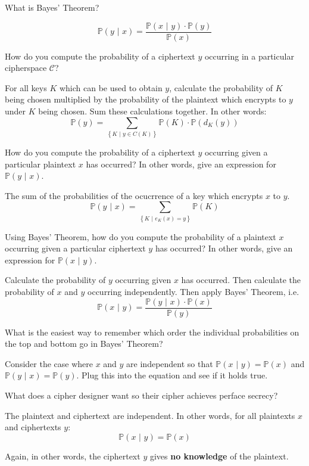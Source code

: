 \documentclass{article}
\newcounter{qcounter}
\newcommand{\showqcounter}{\theqcounter}
\newcommand{\question}{\vspace{5mm}\addtocounter{qcounter}{1}\vspace{5mm}{\bf Q\showqcounter: }}
\newcommand{\answer}{\vspace{5mm}{\bf A\showqcounter: }}
\newcommand{\probgiven}[2]{\mathbb{P}\left( #1 \,\, \vert \,\, #2 \right)}
\newcommand{\prob}[1]{\mathbb{P}\left( #1 \right)}
\begin{document}
\question What is Bayes' Theorem?

\answer 
  $$
    \probgiven{y}{x} = \frac{\probgiven{x}{y} \cdot \prob{y}}{\prob{x}}
  $$


\question How do you compute the probability of a ciphertext $y$ occurring in a particular cipherspace $\mathcal{C}$?

\answer For all keys $K$ which can be used to obtain $y$, calculate the probability of $K$ being chosen multiplied by the probability 
  of the plaintext which encrypts to $y$ under $K$ being chosen. Sum these calculations together. In other words:
  $$
    \prob{y} = \sum_{\left\{ K \,\, \vert \,\, y \in C(K)\right\}} \prob{K} \cdot \prob{d_K(y)}
  $$


\question How do you compute the probability of a ciphertext $y$ occurring given a particular plaintext $x$ has occurred? In other 
  words, give an expression for $\probgiven{y}{x}$.

\answer The sum of the probabilities of the ocucrrence of a key which encrypts $x$ to $y$.
  $$
    \probgiven{y}{x} = \sum_{ \left\{ K \,\, \vert \,\, e_K(x) = y \right\} } \prob{K}
  $$


\question Using Bayes' Theorem, how do you compute the probability of a plaintext $x$ occurring given a particular ciphertext $y$ 
  has occurred? In other words, give an expression for $\probgiven{x}{y}$.

\answer Calculate the probability of $y$ occurring given $x$ has occurred. Then calculate the probability of $x$ and $y$ occurring independently.
  Then apply Bayes' Theorem, i.e.
  $$
    \probgiven{x}{y} = \frac{\probgiven{y}{x} \cdot \prob{x}}{\prob{y}}
  $$


\question What is the easiest way to remember which order the individual probabilities on the top and bottom go in Bayes' Theorem?

\answer Consider the case where $x$ and $y$ are independent so that $\probgiven{x}{y} = \prob{x}$ and $\probgiven{y}{x} = \prob{y}$. Plug 
  this into the equation and see if it holds true.


\question What does a cipher designer want so their cipher achieves perface secrecy?

\answer The plaintext and ciphertext are independent. In other words, for all plaintexts $x$ and ciphertexts $y$:
  $$
    \probgiven{x}{y} = \prob{x}
  $$

  Again, in other words, the ciphertext $y$ gives {\bf no knowledge} of the plaintext.
\end{document}
